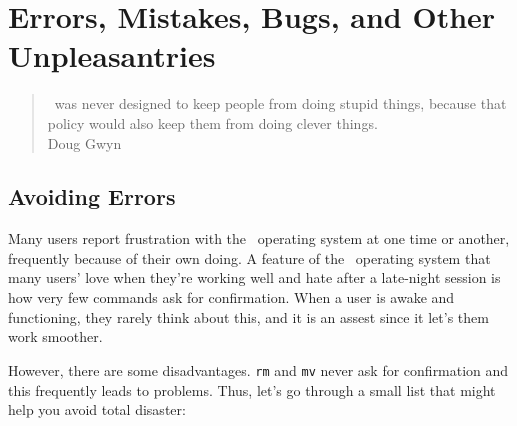 \chapter{Errors, Mistakes, Bugs, and Other Unpleasantries}\label{error-chapter}

\begin{quote}
\unix\ was never designed to keep people from doing stupid things,
because that policy would also keep them from doing clever things.\\
\raggedleft Doug Gwyn
\end{quote}

\section{Avoiding Errors}

Many users report frustration with the \unix\ operating system at one
time or another, frequently because of their own doing.  A feature of
the \unix\ operating system that many users' love when they're working
well and hate after a late-night session is how very few commands ask
for confirmation.  When a user is awake and functioning, they rarely
think about this, and it is an assest since it let's them work
smoother.

However, there are some disadvantages.  {\tt rm} and {\tt mv} never
ask for confirmation and this frequently leads to problems.  Thus,
let's go through a small list that might help you avoid total
disaster:

